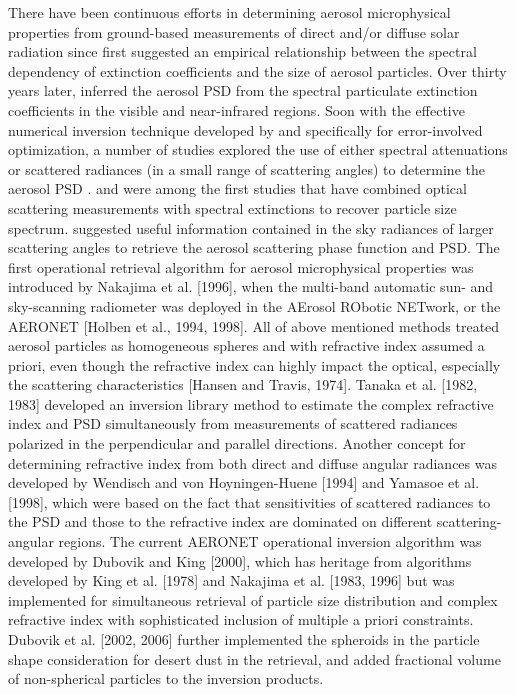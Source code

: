 There have been continuous efforts in determining aerosol microphysical
properties from ground-based measurements of direct and/or diffuse solar
radiation since \citet{angstrom29} first suggested an empirical relationship
between the spectral dependency of extinction coefficients and the size of
aerosol particles. Over thirty years later, \citet{curcio61} inferred the aerosol
PSD from the spectral particulate extinction coefficients in the visible and
near-infrared regions. Soon with the effective numerical inversion technique
developed by \citet{Phillips62} and \citet{twomey63} specifically for error-involved
optimization, a number of studies explored the use of either spectral
attenuations or scattered radiances (in a small range of scattering angles) to
determine the aerosol PSD
\citep{Twomey67,Yamamoto69,Dave71,Grassl71,Herman71,King78}.
\citet{Shaw79} and \citet{Nakajima83} were among the first studies that have combined
optical scattering measurements with spectral extinctions to recover particle
size spectrum. \citet{Kaufman94} suggested useful information contained in
the sky radiances of larger scattering angles to retrieve the aerosol
scattering phase function and PSD. The first operational retrieval algorithm
for aerosol microphysical properties was introduced by Nakajima et al. [1996],
when the multi-band automatic sun- and sky-scanning radiometer was deployed in
the AErosol RObotic NETwork, or the AERONET [Holben et al., 1994, 1998]. All of
above mentioned methods treated aerosol particles as homogeneous spheres and
with refractive index assumed a priori, even though the refractive index can
highly impact the optical, especially the scattering characteristics [Hansen
and Travis, 1974].  Tanaka et al. [1982, 1983] developed an inversion library
method to estimate the complex refractive index and PSD simultaneously from
measurements of scattered radiances polarized in the perpendicular and parallel
directions. Another concept for determining refractive index from both direct
and diffuse angular radiances was developed by Wendisch and von Hoyningen-Huene
[1994] and Yamasoe et al. [1998], which were based on the fact that
sensitivities of scattered radiances to the PSD and those to the refractive
index are dominated on different scattering-angular regions. The current
AERONET operational inversion algorithm was developed by Dubovik and King
[2000], which has heritage from algorithms developed by King et al. [1978] and
Nakajima et al. [1983, 1996] but was implemented for simultaneous retrieval of
particle size distribution and complex refractive index with sophisticated
inclusion of multiple a priori constraints. Dubovik et al. [2002, 2006] further
implemented the spheroids in the particle shape consideration for desert dust
in the retrieval, and added fractional volume of non-spherical particles to the
inversion products.


